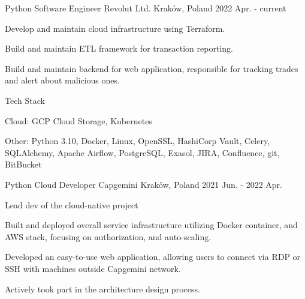 

\begin{cventries}

  \cventry
    {Python Software Engineer} %
    {Revolut Ltd.} %
    {Kraków, Poland} %
    {2022 Apr. - current} %
    {
      \begin{cvitems} %
        \item {Develop and maintain cloud infrastructure using Terraform.}
        \item {Build and maintain ETL framework for transaction reporting.}
        \item {Build and maintain backend for web application, responsible for tracking trades and alert about malicious ones.}
      \end{cvitems}
    }

  \cventry
    {Tech Stack} %
    {}
    {}
    {}
    {
      \begin{cvitems}
        \item {Cloud: GCP Cloud Storage, Kubernetes}
        \item {Other: Python 3.10, Docker, Linux, OpenSSL, HashiCorp Vault, Celery, SQLAlchemy, Apache Airflow, PostgreSQL, Exasol, JIRA, Confluence, git, BitBucket}
      \end{cvitems}
    }

  \cventry
    {Python Cloud Developer} %
    {Capgemini} %
    {Kraków, Poland} %
    {2021 Jun. - 2022 Apr.} %
    {
      \begin{cvitems} %
        \item {Lead dev of the cloud-native project}
        \item {Built and deployed overall service infrastructure utilizing Docker container, and AWS stack, focusing on authorization, and auto-scaling.}
        \item {Developed an easy-to-use web application, allowing users to connect via RDP or SSH with machines outside Capgemini network.}
        \item {Actively took part in the architecture design process.}
      \end{cvitems}
    }


\end{cventries}
